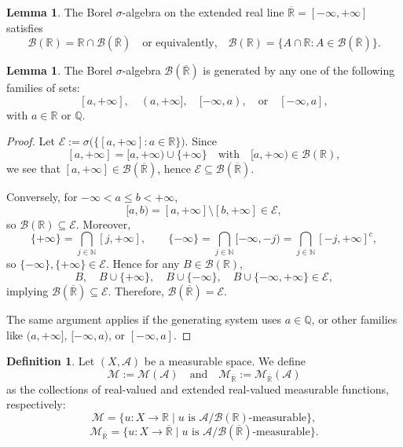 \documentclass[12pt]{article}
\theoremstyle{definition}
\newtheorem{definition}{Definition}[section]
\newtheorem{lemma}[theorem]{Lemma}
\begin{document}
\medskip
\begin{lemma}
The Borel \( \sigma \)-algebra on the extended real line \( \overline{\mathbb{R}} = [-\infty, +\infty] \) satisfies
\[
\mathcal{B}(\mathbb{R}) = {\mathbb{R}} \cap \mathcal{B}(\overline{\mathbb{R}})
\quad \text{or equivalently,} \quad
\mathcal{B}(\mathbb{R}) = \{ A \cap \mathbb{R} : A \in \mathcal{B}(\overline{\mathbb{R}}) \}.
\]
\end{lemma}

\medskip
\begin{lemma}
The Borel \( \sigma \)-algebra \( \mathcal{B}(\overline{\mathbb{R}}) \) is generated by any one of the following families of sets:
\[
[a, +\infty], \quad (a, +\infty], \quad [-\infty, a), \quad \text{or} \quad [-\infty, a],
\]
with \( a \in \mathbb{R} \) or \( \mathbb{Q} \).
\end{lemma}

\begin{proof}
Let \( \mathcal{E} := \sigma\big( \{ [a, +\infty] : a \in \mathbb{R} \} \big) \). Since
\[
[a, +\infty] = [a, +\infty) \cup \{ +\infty \} \quad \text{with} \quad [a, +\infty) \in \mathcal{B}(\mathbb{R}),
\]
we see that \( [a, +\infty] \in \mathcal{B}(\overline{\mathbb{R}}) \), hence \( \mathcal{E} \subseteq \mathcal{B}(\overline{\mathbb{R}}) \).

Conversely, for \( -\infty < a \leq b < +\infty \),
\[
[a, b) = [a, +\infty] \setminus [b, +\infty] \in \mathcal{E},
\]
so \( \mathcal{B}(\mathbb{R}) \subseteq \mathcal{E} \). Moreover,
\[
\{ +\infty \} = \bigcap_{j \in \mathbb{N}} [j, +\infty], \qquad
\{ -\infty \} = \bigcap_{j \in \mathbb{N}} [-\infty, -j) = \bigcap_{j \in \mathbb{N}} [-j, +\infty]^c,
\]
so \( \{ -\infty \}, \{ +\infty \} \in \mathcal{E} \). Hence for any \( B \in \mathcal{B}(\mathbb{R}) \),
\[
B, \quad B \cup \{ +\infty \}, \quad B \cup \{ -\infty \}, \quad B \cup \{ -\infty, +\infty \} \in \mathcal{E},
\]
implying \( \mathcal{B}(\overline{\mathbb{R}}) \subseteq \mathcal{E} \). Therefore, \( \mathcal{B}(\overline{\mathbb{R}}) = \mathcal{E} \).

The same argument applies if the generating system uses \( a \in \mathbb{Q} \), or other families like \( (a, +\infty] \), \( [-\infty, a) \), or \( [-\infty, a] \).
\end{proof}

\medskip
\begin{definition}
Let \( (X, \mathcal{A}) \) be a measurable space. We define
\[
\mathcal{M} := \mathcal{M}(\mathcal{A}) \quad \text{and} \quad \mathcal{M}_{\overline{\mathbb{R}}} := \mathcal{M}_{\overline{\mathbb{R}}}(\mathcal{A})
\]
as the collections of real-valued and extended real-valued measurable functions, respectively:
\[
\mathcal{M} = \{ u : X \to \mathbb{R} \mid u \text{ is } \mathcal{A}/\mathcal{B}(\mathbb{R})\text{-measurable} \},
\]
\[
\mathcal{M}_{\overline{\mathbb{R}}} = \{ u : X \to \overline{\mathbb{R}} \mid u \text{ is } \mathcal{A}/\mathcal{B}(\overline{\mathbb{R}})\text{-measurable} \}.
\]
\end{definition}
\end{document}
